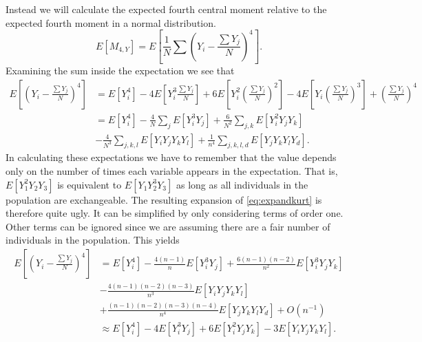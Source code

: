 Instead we will calculate the expected fourth central moment relative to the
expected fourth moment in a normal distribution. 
\begin{equation}
  E[M_{4,Y}] = E\left[\frac{1}{N} \sum \left( Y_i - \frac{\sum Y_j}{N} \right)^4 \right].
\end{equation}
Examining the sum inside the expectation we see that 
\begin{align}
  \label{eq:expandkurt}
  E\left[ \left( Y_i - \frac{\sum Y_j}{N} \right)^4 \right] &= E[Y_i^4] - 
                                                              4E\left[ Y_i^3 \frac{\sum Y_j}{N} \right] + 
                                                              6E\left[Y_i^2\left(\frac{\sum Y_j}{N}\right)^2\right] - 
                                                              4E\left[Y_i\left(\frac{\sum Y_j}{N}\right)^3\right]+ 
                                                              \left(\frac{\sum Y_j}{N}\right)^4 \nonumber \\
                                                            &= E[Y_i^4] - 
                                                              \frac{4}{N}\sum_j E[Y_i^3Y_j] + 
                                                              \frac{6}{N^2}\sum_{j,k} E[Y_i^2Y_jY_k] \nonumber\\
                                                              &-\frac{4}{N^3}\sum_{j,k,l}E[Y_iY_jY_kY_l] + 
                                                              \frac{1}{n^4}\sum_{j,k,l,d}E[Y_jY_kY_lY_d].
\end{align}
In calculating these expectations we have to remember that the value depends
only on the number of times each variable appears in the expectation. That is,
$E[Y_1^2Y_2Y_3]$ is equivalent to $E[Y_1Y_2^3Y_3]$ as long as all individuals in
the population are exchangeable. The resulting expansion of
\eqref{eq:expandkurt} is therefore quite ugly. It can be simplified by only
considering terms of order one. Other terms can be ignored since we are
assuming there are a fair number of individuals in the population. This yields
\begin{align}
  \label{eq:popkurt}
  E\left[ \left( Y_i - \frac{\sum Y_j}{N} \right)^4 \right] &=
  E[Y_i^4]  - \frac{4(n-1)}{n}E[Y_i^3Y_j] + \frac{6(n-1)(n-2)}{n^2}E[Y_i^3Y_jY_k]  \nonumber \\
  &- \frac{4(n-1)(n-2)(n-3)}{n^3}E[Y_iY_jY_kY_l] \nonumber \\
  &+ \frac{(n-1)(n-2)(n-3)(n-4)}{n^4}E[Y_jY_kY_lY_d]
  + O(n^{-1}) \nonumber \\
  &\approx E[Y_i^4]  - 4E[Y_i^3Y_j] + 6E[Y_i^2Y_jY_k] - 3E[Y_iY_jY_kY_l].
\end{align}

